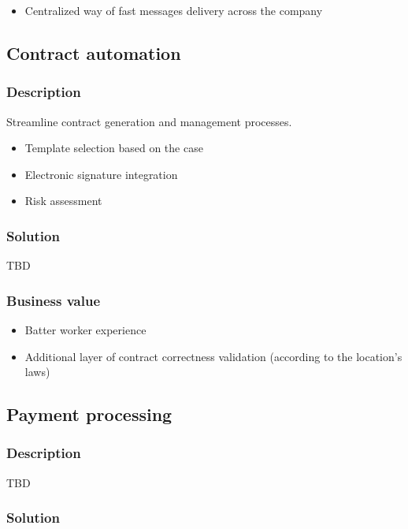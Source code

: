 \documentclass[11pt]{article}
\begin{document}
\begin{itemize}
\item Centralized way of fast messages delivery across the company
\end{itemize}
\subsection{Contract automation}
\label{sec:orgc418fff}

\subsubsection{Description}
\label{sec:org5d20ae5}

Streamline contract generation and management processes.
\begin{itemize}
\item Template selection based on the case
\item Electronic signature integration
\item Risk assessment
\end{itemize}
\subsubsection{Solution}
\label{sec:org7ff17f3}

TBD
\subsubsection{Business value}
\label{sec:orge254e6c}

\begin{itemize}
\item Batter worker experience
\item Additional layer of contract correctness validation (according to the location's laws)
\end{itemize}
\subsection{Payment processing}
\label{sec:org4b5084c}

\subsubsection{Description}
\label{sec:org3b51210}

TBD
\subsubsection{Solution}
\label{sec:orgcf5341d}
\end{document}
